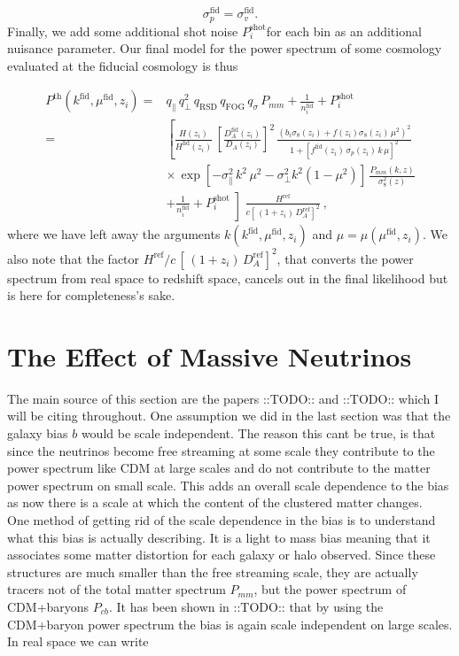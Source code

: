 \documentclass[oneside]{book}
\newcommand*{\marktodo}{{\color{mmcol} ::TODO::}\xspace}
\begin{document}
\begin{equation}
    \sigma_p^\mathrm{fid} = \sigma_v^\mathrm{fid}.
\end{equation}
Finally, we add some additional shot noise $P^\mathrm{shot}_i$for each bin as an additional nuisance parameter. Our final model for the power spectrum of some cosmology evaluated at the fiducial cosmology is thus

\begin{align}
    P^\mathrm{th}(k^\mathrm{fid},\mu^\mathrm{fid},z_i) =& q_\| \, q_\perp^2 \, q_\mathrm{RSD}\, q_\mathrm{FOG}\, q_\sigma\, P_{mm} + \frac{1}{n_i^\mathrm{fid}} + P_i^\mathrm{shot}\\
    =& \left[\frac{H(z_i)}{H^\mathrm{fid}(z_i)}\, \left[\frac{D^\mathrm{fid}_A(z_i)}{D_A(z_i)}\right]^2 \, \frac{\left(b_i \sigma_8(z_i) + f(z_i) \sigma_8(z_i) \,\mu^2 \right)^2}{1+\left[f^\mathrm{fid}(z_i)\,\sigma_p(z_i)\,k\,\mu\right]^2} \right. \nonumber\\
    &\times\,\exp\left[- \sigma_\|^2 \, k^2\,\mu^2 - \sigma_\perp^2 k^2 \left(1-\mu^2\right) \right]\, \frac{P_{mm}(k,z)}{\sigma_8^2(z)} \nonumber \\
    &+ \left.\frac{1}{n_i^\mathrm{fid}} + P_i^\mathrm{shot}\middle] \frac{H^\mathrm{ref}}{c\left[ \,(1+z_i)\,D_A^\mathrm{ref}\right]^2}\right.\:,\nonumber
\end{align}
where we have left away the arguments $k(k^\mathrm{fid},\mu^\mathrm{fid},z_i)$ and $\mu=\mu(\mu^\mathrm{fid},z_i)$. We also note that the factor $H^\mathrm{ref}/c\,\left[ \,(1+z_i)\,D_A^\mathrm{ref}\right]^2$, that converts the power spectrum from real space to redshift space, cancels out in the final likelihood but is here for completeness’s sake.

\section{The Effect of Massive Neutrinos}
The main source of this section are the papers \marktodo and \marktodo which I will be citing throughout. One assumption we did in the last section was that the galaxy bias $b$ would be scale independent. The reason this cant be true, is that since the neutrinos become free streaming at some scale they contribute to the power spectrum like CDM at large scales and do not contribute to the matter power spectrum on small scale. This adds an overall scale dependence to the bias as now there is a scale at which the content of the clustered matter changes.\\
One method of getting rid of the scale dependence in the bias is to understand what this bias is actually describing. It is a light to mass bias meaning that it associates some matter distortion for each galaxy or halo observed. Since these structures are much smaller than the free streaming scale, they are actually tracers not of the total matter spectrum $P_{mm}$, but the power spectrum of CDM+baryons $P_{cb}$. It has been shown in \marktodo that by using the CDM+baryon power spectrum the bias is again scale independent on large scales. In real space we can write 
\end{document}
